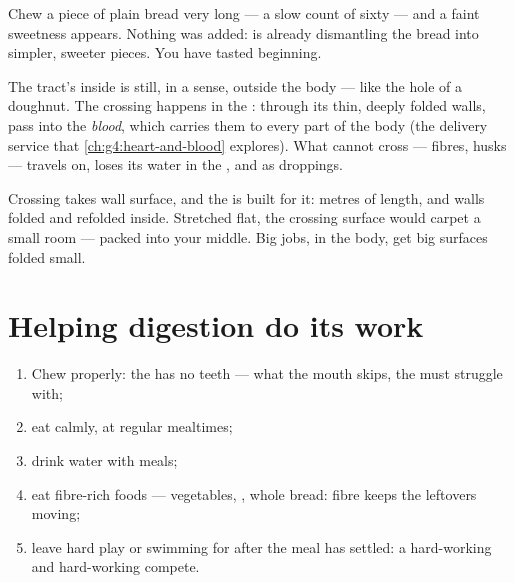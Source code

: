 \begin{example}\label{ex:g4:journey-of-food:sweet}
Chew a piece of plain bread very long --- a slow count of
sixty --- and a faint sweetness appears. Nothing was added:
 is already dismantling the bread into simpler, sweeter
pieces. You have tasted  beginning.
\end{example}

\begin{proposition}\label{prop:g4:journey-of-food:absorb}
The tract's inside is still, in a sense, outside the body ---
like the hole of a doughnut. The crossing happens in the
\emph{}: through its thin, deeply folded
walls,  pass into the \emph{blood},
which carries them to every part of the body
(the delivery service that \cref{ch:g4:heart-and-blood}
explores). What cannot cross --- fibres, husks --- travels
on, loses its water in the , and  as
droppings.
\end{proposition}
\admitted

\begin{remark}\label{rem:g4:journey-of-food:surface}
Crossing takes wall surface, and the  is built
for it: metres of length, and walls folded and refolded
inside. Stretched flat, the crossing surface would carpet a
small room --- packed into your middle. Big jobs, in the
body, get big surfaces folded small.
\end{remark}

\section{Helping digestion do its work}

\begin{method}\label{met:g4:journey-of-food:habits}
\begin{enumerate}
  \item Chew properly: the  has no teeth --- what the
        mouth skips, the  must struggle with;
  \item eat calmly, at regular mealtimes;
  \item drink water with meals;
  \item eat fibre-rich foods --- vegetables, , whole
        bread: fibre keeps the leftovers moving;
  \item leave hard play or swimming for after the meal has
        settled: a hard-working  and hard-working 
        compete.
\end{enumerate}
\end{method}

